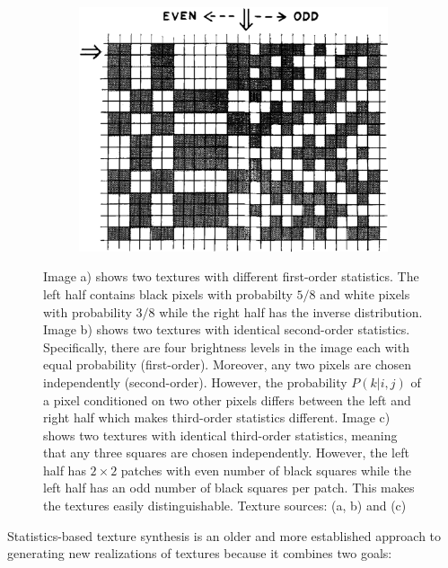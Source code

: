 \begin{figure}[ht]
\begin{subfigure}[b]{0.29\textwidth}
        \caption{}
    \end{subfigure}
    \hfill
    \begin{subfigure}[b]{0.39\textwidth}
        \centering
        \includegraphics[width=\textwidth]{images/02-julesz-3rd_order_compressed.jpg}
        \caption{}
    \end{subfigure}
    \caption{Image a) shows two textures with different first-order statistics. The left half contains black pixels with probabilty \(5/8\) and white pixels with probability \(3/8\) while the right half has the inverse distribution. Image b) shows two textures with identical second-order statistics. Specifically, there are four brightness levels in the image each with equal probability (first-order). Moreover, any two pixels are chosen independently (second-order). However, the probability \(P(k | i,j)\) of a pixel conditioned on two other pixels differs between the left and right half which makes third-order statistics different. Image c) shows two textures with identical third-order statistics, meaning that any three squares are chosen independently. However, the left half has \(2 \times 2\) patches with even number of black squares while the left half has an odd number of black squares per patch. This makes the textures easily distinguishable. Texture sources: \citet{Julesz1962} (a, b) and \citet{Julesz1973} (c)}
    \label{fig:background_julesz_textures}
\end{figure}

Statistics-based texture synthesis is an older and more established approach to generating new realizations of textures because it combines two goals:

